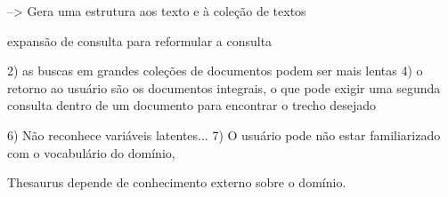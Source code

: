 

--> Gera uma estrutura aos texto e à coleção de textos



expansão de consulta para reformular a consulta

2) as buscas em grandes coleções de documentos podem ser mais lentas 
4) o retorno ao usuário são os documentos integrais, o que pode exigir uma segunda consulta dentro de um documento para encontrar o trecho desejado


6) Não reconhece variáveis latentes...
7) O usuário pode não estar familiarizado com o vocabulário do domínio, %

Thesaurus depende de conhecimento externo sobre o domínio.








